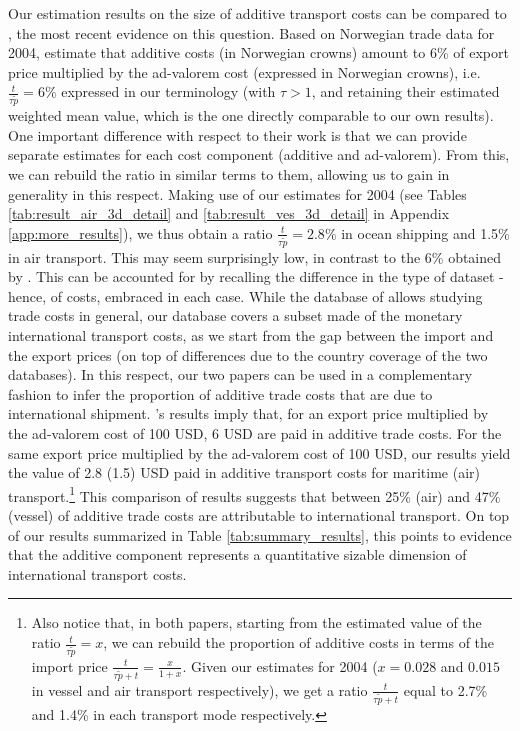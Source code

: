 \documentclass[a4paper,11pt]{article}
\begin{document}
Our estimation results on the size of additive transport costs can be compared to \cite{Irrazabal_2015}, the most recent evidence on this question.
Based on Norwegian trade data for 2004, \cite{Irrazabal_2015} estimate that additive costs (in Norwegian crowns) amount to 6\% of export price multiplied by the ad-valorem cost (expressed in Norwegian crowns), i.e.
$\frac{t}{\tau\widetilde{p}}=6\%$ expressed in our terminology (with $\tau>1$, and retaining their estimated weighted mean value, which is the one directly comparable to our own results).
One important difference with respect to their work is that we can provide separate estimates for each cost component (additive and ad-valorem).
From this, we can rebuild the ratio in similar terms to them, allowing us to gain in generality in this respect.
Making use of our estimates for 2004 (see Tables \ref{tab:result_air_3d_detail} and \ref{tab:result_ves_3d_detail} in Appendix \ref{app:more_results}), we thus obtain a ratio $\frac{t}{\tau\widetilde{p}}=2.8\%$ in ocean shipping and 1.5\% in air transport.
This may seem surprisingly low, in contrast to the 6\% obtained by \cite{Irrazabal_2015}.
This can be accounted for by recalling the difference in the type of dataset - hence, of costs, embraced in each case.
While the database of \cite{Irrazabal_2015} allows studying trade costs in general, our database covers a subset made of the monetary international transport costs, as we start from the gap between the import and the export prices (on top of differences due to the country coverage of the two databases).
In this respect, our two papers can be used in a complementary fashion to infer the proportion of additive trade costs that are due to international shipment.
\cite{Irrazabal_2015}'s results imply that, for an export price multiplied by the ad-valorem cost of 100 USD, 6 USD are paid in additive trade costs.
For the same export price multiplied by the ad-valorem cost of 100 USD, our results yield the value of 2.8 (1.5) USD paid in additive transport costs for maritime (air) transport.\footnote{Also notice that, in both papers, starting from the estimated value of the ratio $\frac{t}{\tau \widetilde{p}}= x$, we can rebuild the proportion of additive costs in terms of the import price $\frac{t}{\tau \widetilde{p} + t} = \frac{x}{1+x}$.
Given our estimates for 2004 ($x = 0.028$ and $0.015$ in vessel and air transport respectively), we get a ratio $\frac{t}{\tau \widetilde{p} + t}$ equal to 2.7\% and 1.4\% in each transport mode respectively.} This comparison of results suggests that between 25\% (air) and 47\% (vessel) of additive trade costs are attributable to international transport.
On top of our results summarized in Table \ref{tab:summary_results}, this points to evidence that the additive component represents a quantitative sizable dimension of international transport costs.\smallskip
\end{document}
